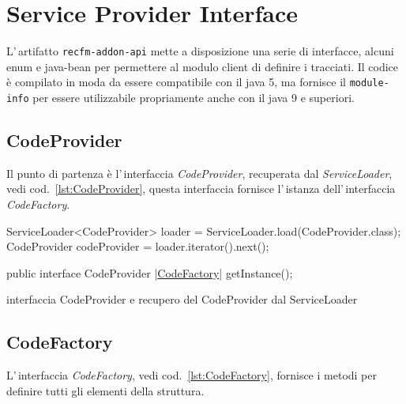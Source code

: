 %                                           

\chapter{Service Provider Interface}
L'\,artifatto \verb!recfm-addon-api! mette a disposizione una serie di 
interfacce, alcuni enum e java-bean per permettere al modulo client di definire
i tracciati. 
Il codice è compilato in moda da essere compatibile con il java 5, ma fornisce
il \verb!module-info! per essere utilizzabile propriamente anche con il java 9
e superiori.

\section{CodeProvider}
Il punto di partenza è l'\,interfaccia \textsl{CodeProvider}, recuperata dal
\textsl{ServiceLoader}, vedi cod.~\ref{lst:CodeProvider}, 
questa interfaccia fornisce l'\,istanza 
dell'\,in\-ter\-fac\-cia \textsl{CodeFactory}.

\begin{elisting}[!htb]
\begin{javacode}
      ServiceLoader<CodeProvider> loader = ServiceLoader.load(CodeProvider.class);
      CodeProvider codeProvider = loader.iterator().next();
\end{javacode}
\vspace*{-1cm}
\begin{javacode}
public interface CodeProvider {
     |\hyperref[lst:CodeFactory]{CodeFactory}| getInstance();
}
\end{javacode}
\caption{interfaccia CodeProvider e recupero del CodeProvider dal ServiceLoader}
\label{lst:CodeProvider}
\end{elisting}


\section{CodeFactory}
L'\,interfaccia \textsl{CodeFactory}, vedi cod.~\ref{lst:CodeFactory}, fornisce 
i metodi per definire tutti gli elementi della struttura.

